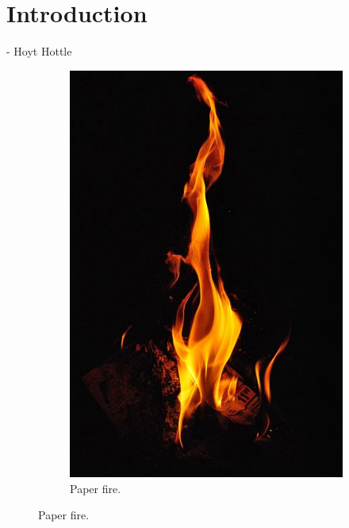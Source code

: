 \chapter{Introduction}
\label{ch:introduction}
 - Hoyt Hottle

\begin{figure}[htpb!]
        \centering
        \begin{subfigure}[t]{0.245\textwidth}
                \includegraphics[width=\textwidth]{img/real_fire1}
                \caption{Paper fire\footnotemark.}
                \label{fig:real_fire1}
        \end{subfigure}%

\end{figure}
